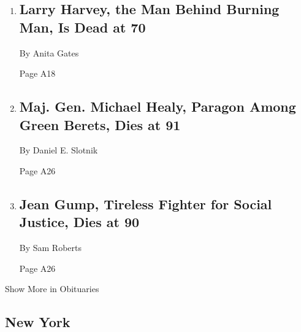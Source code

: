 \begin{enumerate}
\def\labelenumi{\arabic{enumi}.}
\item
  \href{/2018/04/28/obituaries/larry-harvey-burning-man-festival-dead-at-70.html}{}

  \hypertarget{larry-harvey-the-man-behind-burning-man-is-dead-at-70}{%
  \subsection{Larry Harvey, the Man Behind Burning Man, Is Dead at
  70}\label{larry-harvey-the-man-behind-burning-man-is-dead-at-70}}

  By Anita Gates

  Page A18
\item
  \href{/2018/04/27/obituaries/maj-gen-michael-healy-paragon-among-green-berets-dies-at-91.html}{}

  \hypertarget{maj-gen-michael-healy-paragon-among-green-berets-dies-at-91}{%
  \subsection{Maj. Gen. Michael Healy, Paragon Among Green Berets, Dies
  at
  91}\label{maj-gen-michael-healy-paragon-among-green-berets-dies-at-91}}

  By Daniel E. Slotnik

  Page A26
\item
  \href{/2018/04/26/obituaries/jean-gump-tireless-fighter-for-social-justice-dies-at-90.html}{}

  \hypertarget{jean-gump-tireless-fighter-for-social-justice-dies-at-90}{%
  \subsection{Jean Gump, Tireless Fighter for Social Justice, Dies at
  90}\label{jean-gump-tireless-fighter-for-social-justice-dies-at-90}}

  By Sam Roberts

  Page A26
\end{enumerate}

Show More in Obituaries

\hypertarget{new-york}{%
\subsection{New York}\label{new-york}}


